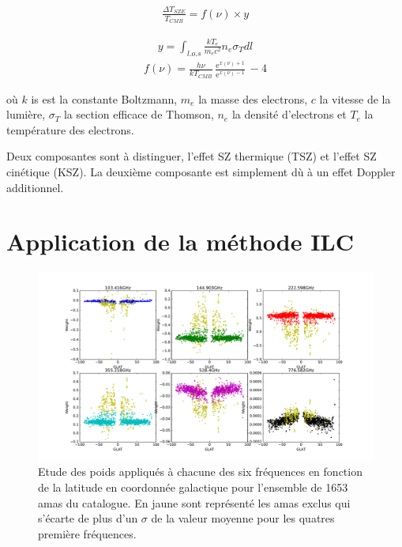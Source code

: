 \documentclass[a4paper,11pt]{article}
\DeclareMathOperator{\e}{e}
\begin{document}
\begin{align*}
  \frac{\Delta T_{SZE}}{T_{CMB}} = f(\nu) \times  y
\end{align*}

\begin{multicols}{2}\noindent
\begin{align*}
  y = \int_{l.o.s} \frac{kT_e}{m_e c^2} n_e \sigma_T dl 
\end{align*}
\begin{align*}
  f(\nu) = \frac{h \nu}{k T_{CMB}} \frac{\e^{x(\nu) + 1}}{\e^{x(\nu)
  -1}} - 4
\end{align*}
\end{multicols}

où $k$ is est la constante Boltzmann, $m_e$ la masse des electrons, $c$
la vitesse de la lumière, $\sigma_T$ la section efficace de Thomson, 
$n_e$ la densité d'electrons et $T_e$ la température des electrons.

Deux composantes sont à distinguer, l'effet SZ thermique (TSZ) et
l'effet SZ cinétique (KSZ). La deuxième composante est simplement dù à un effet
Doppler additionnel. 

\section{Application de la méthode ILC}

\begin{figure}[b!]
  \centering
  \label{w_lat}
  \includegraphics[width=6in]{w_lat.pdf}
  \caption{Etude des poids appliqués à chacune des six fréquences en
    fonction de la latitude en coordonnée galactique pour
  l'ensemble de 1653 amas du catalogue. En jaune sont représenté les
  amas exclus qui s'écarte de plus d'un $\sigma$ de la valeur moyenne
  pour les quatres première fréquences.}
\end{figure}
\end{document}
